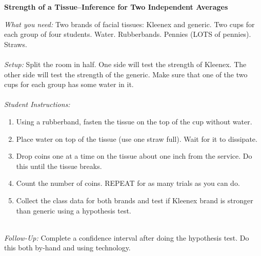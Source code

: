 \documentclass[12pt]{amsart}
\theoremstyle{definition}
\begin{document}
       \begin{framed}
       	\begin{center} \textbf{Strength of a Tissue--Inference for Two Independent Averages} \end{center}
       	\emph{What you need:} Two brands of facial tissues: Kleenex and generic. Two cups for each group of four students. Water. Rubberbands. Pennies (LOTS of pennies). Straws.\\
       	~\\
       	\emph{Setup:} Split the room in half. One side will test the strength of Kleenex. The other side will test the strength of the generic. Make sure that one of the two cups for each group has some water in it.\\
       	~\\
       	\emph{Student Instructions:} 
       	\begin{enumerate}
       		\item Using a rubberband, fasten the tissue on the top of the cup without water.
       		\item Place water on top of the tissue (use one straw full). Wait for it to dissipate.
       		\item Drop coins one at a time on the tissue about one inch from the service. Do this until the tissue breaks.
       		\item Count the number of coins. REPEAT for as many trials as you can do.
       		\item Collect the class data for both brands and test if Kleenex brand is stronger than generic using a hypothesis test.
       	\end{enumerate}
       	~\\
       	\emph{Follow-Up:} Complete a confidence interval after doing the hypothesis test. Do this both by-hand and using technology.
       \end{framed}
       
       \newpage
      
\end{document}
